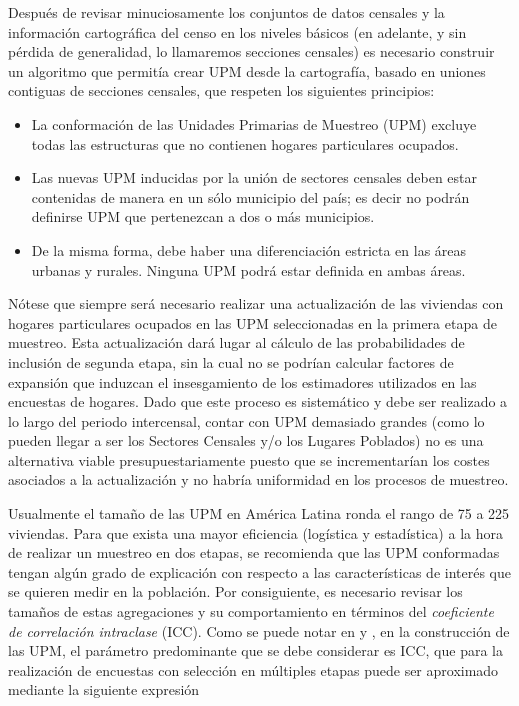 \documentclass[
  10pt,
  spanish,
]{book}
\providecommand{\tightlist}{%
  \setlength{\itemsep}{0pt}\setlength{\parskip}{0pt}}
\begin{document}
Después de revisar minuciosamente los conjuntos de datos censales y la información cartográfica del censo en los niveles básicos (en adelante, y sin pérdida de generalidad, lo llamaremos secciones censales) es necesario construir un algoritmo que permitía crear UPM desde la cartografía, basado en uniones contiguas de secciones censales, que respeten los siguientes principios:

\begin{itemize}
\tightlist
\item
  La conformación de las Unidades Primarias de Muestreo (UPM) excluye todas las estructuras que no contienen hogares particulares ocupados.
\item
  Las nuevas UPM inducidas por la unión de sectores censales deben estar contenidas de manera en un sólo municipio del país; es decir no podrán definirse UPM que pertenezcan a dos o más municipios.
\item
  De la misma forma, debe haber una diferenciación estricta en las áreas urbanas y rurales. Ninguna UPM podrá estar definida en ambas áreas.
\end{itemize}

Nótese que siempre será necesario realizar una actualización de las viviendas con hogares particulares ocupados en las UPM seleccionadas en la primera etapa de muestreo. Esta actualización dará lugar al cálculo de las probabilidades de inclusión de segunda etapa, sin la cual no se podrían calcular factores de expansión que induzcan el insesgamiento de los estimadores utilizados en las encuestas de hogares. Dado que este proceso es sistemático y debe ser realizado a lo largo del periodo intercensal, contar con UPM demasiado grandes (como lo pueden llegar a ser los Sectores Censales y/o los Lugares Poblados) no es una alternativa viable presupuestariamente puesto que se incrementarían los costes asociados a la actualización y no habría uniformidad en los procesos de muestreo.

Usualmente el tamaño de las UPM en América Latina ronda el rango de 75 a 225 viviendas. Para que exista una mayor eficiencia (logística y estadística) a la hora de realizar un muestreo en dos etapas, se recomienda que las UPM conformadas tengan algún grado de explicación con respecto a las características de interés que se quieren medir en la población. Por consiguiente, es necesario revisar los tamaños de estas agregaciones y su comportamiento en términos del \emph{coeficiente de correlación intraclase} (ICC). Como se puede notar en \citet{Cochran_1977} y \citet{Gutierrez_2016}, en la construcción de las UPM, el parámetro predominante que se debe considerar es ICC, que para la realización de encuestas con selección en múltiples etapas puede ser aproximado mediante la siguiente expresión \citep{Valliant_Dever_Kreuter_2013}
\end{document}
